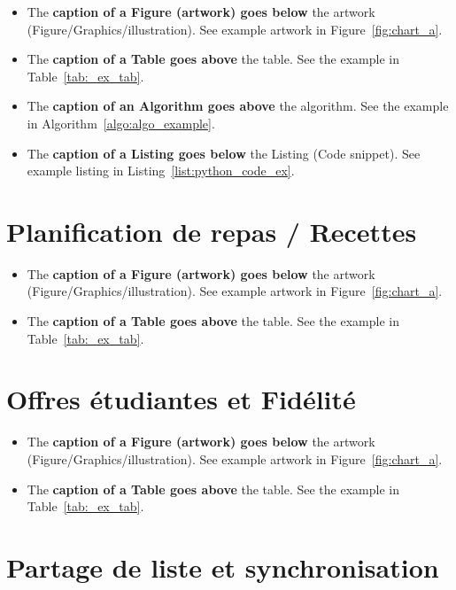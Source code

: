 \begin{itemize}
    \item The \textbf{caption of a Figure (artwork) goes below} the artwork (Figure/Graphics/illustration). See example artwork in Figure~\ref{fig:chart_a}. 
    \item  The \textbf{caption of a Table goes above} the table. See the example in Table~\ref{tab:_ex_tab}.
    \item  The \textbf{caption of an Algorithm goes above} the algorithm. See the example in Algorithm~\ref{algo:algo_example}.
    \item The \textbf{caption of a Listing goes below} the Listing  (Code snippet). See example listing in Listing~\ref{list:python_code_ex}. 
\end{itemize} 


\section{Planification de repas / Recettes}

\begin{itemize}
    \item The \textbf{caption of a Figure (artwork) goes below} the artwork (Figure/Graphics/illustration). See example artwork in Figure~\ref{fig:chart_a}. 
    \item  The \textbf{caption of a Table goes above} the table. See the example in Table~\ref{tab:_ex_tab}. 
\end{itemize} 



\section{Offres étudiantes et Fidélité}

\begin{itemize}
    \item The \textbf{caption of a Figure (artwork) goes below} the artwork (Figure/Graphics/illustration). See example artwork in Figure~\ref{fig:chart_a}. 
    \item  The \textbf{caption of a Table goes above} the table. See the example in Table~\ref{tab:_ex_tab}. 
\end{itemize} 



\section{Partage de liste et synchronisation}

